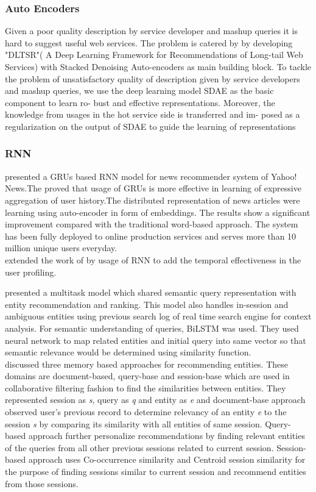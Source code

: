 \subsubsection{Auto Encoders}
Given a poor quality description by service developer and mashup queries it is hard to suggest useful web services. The problem is catered by \cite{N59} by developing "DLTSR"( A Deep Learning Framework for Recommendations of Long-tail Web Services) with Stacked Denoising Auto-encoders as main building block.
 To tackle the problem of unsatisfactory quality of description given by service developers and mashup queries, we use the deep learning model SDAE as the basic component to learn ro- bust and effective representations. Moreover, the knowledge from usages in the hot service side is transferred and im- posed as a regularization on the output of SDAE to guide the learning of representations
 \subsubsection{RNN}
 \cite{p2} presented a GRUs based RNN model for news recommender system of Yahoo! News.The proved that usage of GRUs is more effective in learning of expressive aggregation of user history.The distributed representation of news articles were learning using auto-encoder in form of embeddings. The results show a significant improvement compared with the traditional word-based approach. The system has been fully deployed to online production services and serves more than 10 million unique users everyday.
 \\
 \cite{N62} extended the work of \cite{N64} by usage of RNN to add the temporal effectiveness in the user profiling.

\cite{N18} presented a multitask model which shared semantic query representation with entity recommendation and ranking. This model also handles in-session and ambiguous entities using previous search log of real time search engine for context analysis. For semantic understanding of queries, BiLSTM was used. They used neural network to map related entities and initial query into same vector so that semantic relevance would be determined using similarity function. 
\\
\cite{N19} discussed three memory based approaches for recommending entities. These domains are document-based, query-base and session-base which are used in collaborative filtering fashion to find the similarities between entities. They represented session as \textit{s}, query as \textit{q} and entity as \textit{e} and document-base approach observed user's previous record to determine relevancy of an entity \textit{e} to the session \textit{s} by comparing its similarity with all entities of same session. Query-based approach further personalize recommendations by finding relevant entities of the queries from all other previous sessions related to current session. Session-based approach uses Co-occurrence similarity and Centroid session similarity for the purpose of finding sessions similar to current session and recommend entities from those sessions. 




